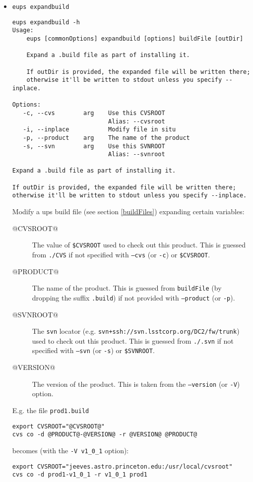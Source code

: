 \documentclass{article}
\newcommand{\code}[1]{\texttt{#1}}
\begin{document}
\begin{itemize}

  \item \code{eups expandbuild}
\begin{verbatim}
eups expandbuild -h
Usage:
    eups [commonOptions] expandbuild [options] buildFile [outDir]

    Expand a .build file as part of installing it.

    If outDir is provided, the expanded file will be written there;
    otherwise it'll be written to stdout unless you specify --inplace.

Options:
   -c, --cvs        arg    Use this CVSROOT
                           Alias: --cvsroot
   -i, --inplace           Modify file in situ
   -p, --product    arg    The name of the product
   -s, --svn        arg    Use this SVNROOT
                           Alias: --svnroot

Expand a .build file as part of installing it.

If outDir is provided, the expanded file will be written there;
otherwise it'll be written to stdout unless you specify --inplace.
\end{verbatim}

Modify a ups build file (see section \ref{buildFiles}) expanding certain variables:
\begin{description}
  \item[\small @CVSROOT@] The value of \code{\$CVSROOT} used to check out this product.
    This is guessed from \code{./CVS} if not specified with \code{--cvs} (or \code{-c})
    or \code{\$CVSROOT}.
  \item[\small @PRODUCT@] The name of the product. This is guessed from \code{buildFile}
    (by dropping the suffix \code{.build}) if not provided with \code{--product} (or \code{-p}).
  \item[\small @SVNROOT@] The \code{svn} locator (e.g. \code{svn+ssh://svn.lsstcorp.org/DC2/fw/trunk})
    used to check out this product.
    This is guessed from \code{./.svn} if not specified with \code{--svn} (or \code{-s})
    or \code{\$SVNROOT}.
  \item[\small @VERSION@] The version of the product.  This is taken from the \code{--version} (or
    \code{-V}) option.
\end{description}

E.g. the file \code{prod1.build}
\begin{verbatim}
export CVSROOT="@CVSROOT@"
cvs co -d @PRODUCT@-@VERSION@ -r @VERSION@ @PRODUCT@
\end{verbatim}
becomes (with the \code{-V v1\_0\_1} option):
\begin{verbatim}
export CVSROOT="jeeves.astro.princeton.edu:/usr/local/cvsroot"
cvs co -d prod1-v1_0_1 -r v1_0_1 prod1
\end{verbatim}


\end{itemize}
\end{document}
